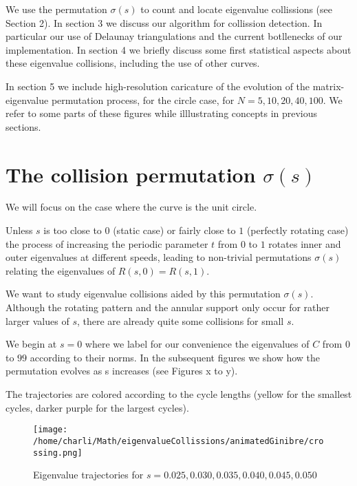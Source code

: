 \documentclass{article}
\begin{document}
	We use the permutation $\sigma(s)$ to count and locate eigenvalue collissions (see Section 2).
	In section 3 we discuss our algorithm for collission detection. 
	In particular our use of Delaunay triangulations and the current botllenecks of our implementation. 
	In section 4 we briefly discuss some first statistical aspects about these eigenvalue collisions, 
	including the use of other curves. 

	In section 5 we include high-resolution caricature of the evolution 
	of the matrix-eigenvalue permutation process, 
	for the circle case, for $N=5, 10, 20, 40, 100$. 
	We refer to some parts of these figures while illlustrating concepts in previous sections.

	\section{The collision permutation $\sigma(s)$}

	We will focus on the case where the curve is the unit circle.

	Unless $s$ is too close to $0$ (static case) or fairly close to $1$ (perfectly rotating case) 
	the process of increasing the periodic parameter $t$ from $0$ to $1$
	rotates inner and outer eigenvalues at different speeds, leading to 
	non-trivial permutations $\sigma(s)$ relating the eigenvalues of $R(s,0) = R(s,1)$.

	We want to study eigenvalue collisions aided by this permutation $\sigma(s)$. 
	Although the rotating pattern and the annular support only occur for rather larger values of $s$,
	there are already quite some collisions for small $s$.

	We begin at $s=0$ where we label for our convenience the eigenvalues of $C$ from $0$ to $99$ 
	according to their norms. In the subsequent figures we show how the permutation evolves as s increases 
	(see Figures x to y).

	The trajectories are colored according to the cycle lengths 
	(yellow for the smallest cycles, darker purple for the largest cycles). 

	
	\newpage
	\begin{figure}[htbp]
		\centering
		\texttt{[image: /home/charli/Math/eigenvalueCollissions/animatedGinibre/crossing.png]}
		\caption{Eigenvalue trajectories for $s= 0.025, 0.030, 0.035, 0.040, 0.045, 0.050$ }
		\label{fig:pdf_image}
	\end{figure}
\end{document}
